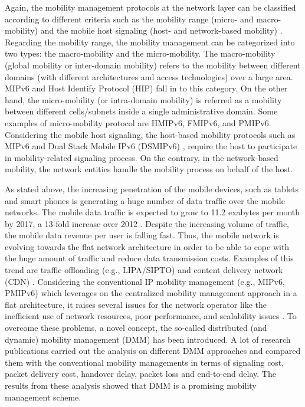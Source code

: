 Again, the mobility management protocols at the network layer can be classified according to different criteria such as the mobility range (micro- and macro-mobility) and the mobile host signaling (host- and network-based mobility) \cite{RFC6301,  survey_mobility_management, mobility_survey,mobility_handoff_management}. Regarding the mobility range, the mobility management can be categorized into two types: the macro-mobility and the micro-mobility. The macro-mobility (global mobility or inter-domain mobility) refers to the mobility between different domains (with different architectures and access technologies) over a large area. MIPv6 and Host Identify Protocol (HIP) \cite{HIP} fall in to this category. On the other hand, the micro-mobility (or intra-domain mobility) is referred as a mobility between different cells/subnets inside a single administrative domain. Some examples of micro-mobility protocol are HMIPv6, FMIPv6, and PMIPv6. Considering the mobile host signaling, the host-based mobility protocols such as MIPv6 and Dual Stack Mobile IPv6 (DSMIPv6) \cite{DSMIPv6}, require the host to participate in mobility-related signaling process. On the contrary, in the network-based mobility, the network entities handle the mobility process on behalf of the host. 

As stated above, the increasing penetration of the mobile devices, such as tablets and smart phones is generating a huge number of data traffic over the mobile networks. The mobile data traffic is expected to grow to 11.2 exabytes per month by 2017, a 13-fold increase over 2012 \cite{cisco_forecast}. Despite the increasing volume of traffic, the mobile data revenue per user is falling fast. Thus, the mobile network is evolving towards the flat network architecture in order to be able to cope with the huge amount of traffic and reduce data transmission costs. Examples of this trend are traffic offloading (e.g., LIPA/SIPTO) and content delivery network (CDN) \cite{DMM_issues}.
Considering the conventional IP mobility management (e.g., MIPv6, PMIPv6) which leverages on the centralized mobility management approach in a flat architecture, it raises several issues for the network operator like the inefficient use of network resources, poor performance, and scalability issues \cite{DMM_requirements, DMM_issues,DMM_problem_statement}. To overcome these problems, a novel concept, the so-called distributed (and dynamic) mobility management (DMM) has been introduced. A lot of research publications \cite{DMM_Bertin, PMIP_based_DMM_Giust, DMM_IETF_Lee, MIP_based_DMM_Condeixa, MIP_based_DMM_Hassan, DMM_analysis_Hassan} carried out the analysis on different DMM approaches and compared them with the conventional mobility managements in terms of signaling cost, packet delivery cost, handover delay, packet loss and end-to-end delay. The results from these analysis showed that DMM is a promising mobility management scheme. \\

